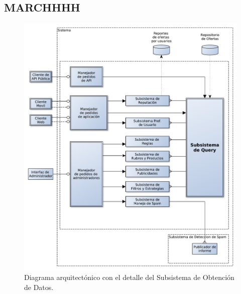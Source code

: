 \\
\\
\\


\subsection{MARCHHHH}

\begin{figure}[H]
	\centering
	\includegraphics[width=\textwidth]{graficos/arch/temp_subsistema_que_habla_con_el_usuario.pdf}
	\caption{Diagrama arquitectónico con el detalle del \textsf{Subsistema de Obtención de Datos}.}
\end{figure}

